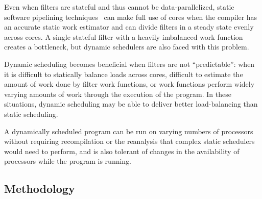 Even when filters are stateful and thus cannot be data-parallelized,
static software pipelining techniques~\cite{asplos06} can make full
use of cores when the compiler has an accurate static work estimator
and can divide filters in a steady state evenly across
cores. A single stateful filter with a heavily imbalanced work
function creates a bottleneck, but dynamic schedulers are also faced
with this problem. 

Dynamic scheduling becomes beneficial when filters are not
``predictable'': when it is difficult to statically balance loads
across cores, difficult to estimate the amount of work done by filter
work functions, or work functions perform widely varying amounts of
work through the execution of the program. In these situations,
dynamic scheduling may be able to deliver better load-balancing than
static scheduling.

A dynamically scheduled program can be run on varying numbers of
processors without requiring recompilation or the reanalysis that
complex static schedulers would need to perform, and is also tolerant
of changes in the availability of processors while the program is
running. 



\subsection{Methodology}

